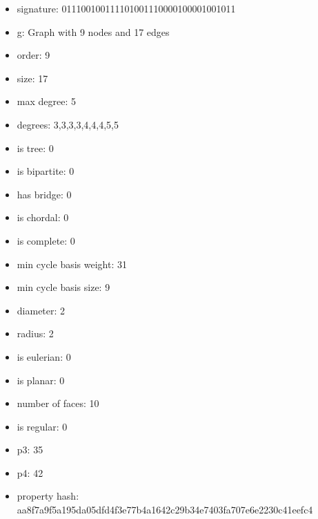 \newpage
\begin{figure}
\end{figure}
\begin{itemize}
\item signature: 011100100111101001110000100001001011
\item g: Graph with 9 nodes and 17 edges
\item order: 9
\item size: 17
\item max degree: 5
\item degrees: 3,3,3,3,4,4,4,5,5
\item is tree: 0
\item is bipartite: 0
\item has bridge: 0
\item is chordal: 0
\item is complete: 0
\item min cycle basis weight: 31
\item min cycle basis size: 9
\item diameter: 2
\item radius: 2
\item is eulerian: 0
\item is planar: 0
\item number of faces: 10
\item is regular: 0
\item p3: 35
\item p4: 42
\item property hash: aa8f7a9f5a195da05dfd4f3e77b4a1642c29b34e7403fa707e6e2230c41eefc4
\end{itemize}
